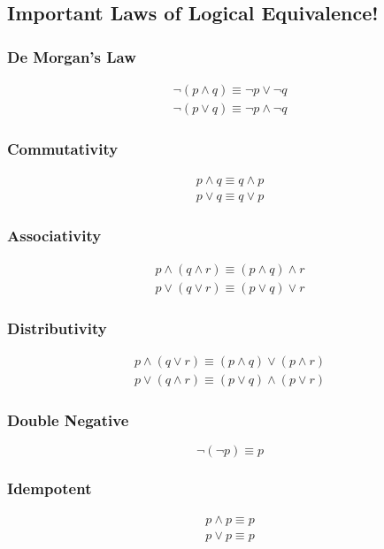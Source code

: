 \documentclass{report}
\begin{document}
\newpage
\subsection*{Important Laws of Logical Equivalence!}
\begin{multicols}{2}
	\subsubsection*{De Morgan's Law}
	\begin{align*}
		\lnot(p\land q) \equiv \lnot p \lor \lnot q \\
		\lnot(p\lor q) \equiv \lnot p \land \lnot q 
	\end{align*}
	
	\subsubsection*{Commutativity}
	\begin{align*}
		p \land q \equiv q\land p \\
		p \lor q \equiv q \lor p
	\end{align*}
	
	\subsubsection*{Associativity}
	\begin{align*}
		p \land (q\land r) \equiv (p\land q) \land r \\
		p \lor (q\lor r) \equiv (p\lor q) \lor r	
	\end{align*}
	
	\subsubsection*{Distributivity}
	\begin{align*}
		p \land (q \lor r) \equiv (p\land q) \lor (p \land r) \\
		p \lor (q \land r) \equiv (p\lor q) \land (p \lor r)
	\end{align*}
	
	\subsubsection*{Double Negative}
	$$
		\lnot(\lnot p) \equiv p
	$$
	
	\subsubsection*{Idempotent}
	\begin{align*}
		p \land p \equiv p \\
		p \lor p \equiv p 
	\end{align*}
	

\end{multicols}
\end{document}
